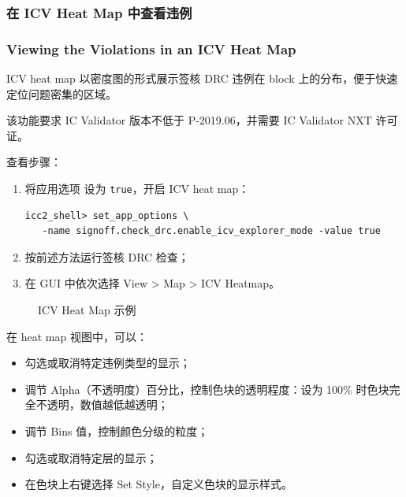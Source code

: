 \subsubsection{在 ICV Heat Map 中查看违例}
\subsubsection*{Viewing the Violations in an ICV Heat Map}

ICV heat map 以密度图的形式展示签核 DRC 违例在 block 上的分布，便于快速定位问题密集的区域。

\begin{noteBox}
该功能要求 IC Validator 版本不低于 P-2019.06，并需要 IC Validator NXT 许可证。
\end{noteBox}

查看步骤：
\begin{enumerate}
  \item 将应用选项  设为 \texttt{true}，开启 ICV heat map：
\begin{lstlisting}
icc2_shell> set_app_options \
   -name signoff.check_drc.enable_icv_explorer_mode -value true
\end{lstlisting}
  \item 按前述方法运行签核 DRC 检查；
  \item 在 GUI 中依次选择 View > Map > ICV Heatmap。
\end{enumerate}

\begin{figure}[htbp]
\centering
{}
\caption{ICV Heat Map 示例}
\label{fig:icv-heatmap}
\end{figure}

在 heat map 视图中，可以：
\begin{itemize}
  \item 勾选或取消特定违例类型的显示；
  \item 调节 Alpha（不透明度）百分比，控制色块的透明程度：设为 100\% 时色块完全不透明，数值越低越透明；
  \item 调节 Bins 值，控制颜色分级的粒度；
  \item 勾选或取消特定层的显示；
  \item 在色块上右键选择 Set Style，自定义色块的显示样式。
\end{itemize}

